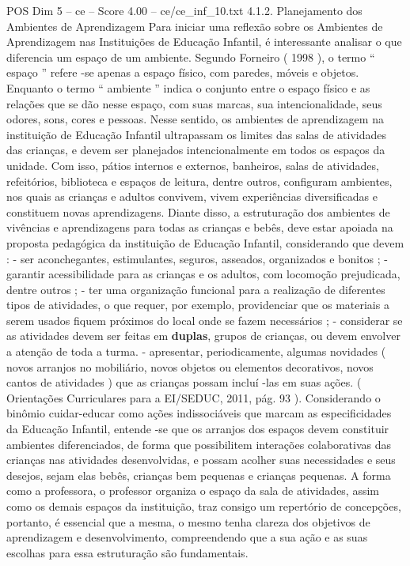 \begin{textsample}{POS Dim 5 – ce – Score 4.00 – ce/ce\_inf\_10.txt}  \label{ex:f5_pos_259}
4.1.2.
Planejamento dos Ambientes de Aprendizagem Para iniciar uma reflexão sobre os Ambientes de Aprendizagem nas Instituições de Educação Infantil, é interessante analisar o que diferencia um espaço de um ambiente.
Segundo Forneiro ( 1998 ), o termo “ espaço ” refere -se apenas a espaço físico, com paredes, móveis e objetos.
Enquanto o termo “ ambiente ” indica o conjunto entre o espaço físico e as relações que se dão nesse espaço, com suas marcas, sua intencionalidade, seus odores, sons, cores e pessoas.
Nesse sentido, os ambientes de aprendizagem na instituição de Educação Infantil ultrapassam os limites das salas de atividades das crianças, e devem ser planejados intencionalmente em todos os espaços da unidade.
Com isso, pátios internos e externos, banheiros, salas de atividades, refeitórios, biblioteca e espaços de leitura, dentre outros, configuram ambientes, nos quais as crianças e adultos convivem, vivem experiências diversificadas e constituem novas aprendizagens.
Diante disso, a estruturação dos ambientes de vivências e aprendizagens para todas as crianças e bebês, deve estar apoiada na proposta pedagógica da instituição de Educação Infantil, considerando que devem : - ser aconchegantes, estimulantes, seguros, asseados, organizados e bonitos ; - garantir acessibilidade para as crianças e os adultos, com locomoção prejudicada, dentre outros ; - ter uma organização funcional para a realização de diferentes tipos de atividades, o que requer, por exemplo, providenciar que os materiais a serem usados fiquem próximos do local onde se fazem necessários ; - considerar se as atividades devem ser feitas em \textbf{duplas}, grupos de crianças, ou devem envolver a atenção de toda a turma. - apresentar, periodicamente, algumas novidades ( novos arranjos no mobiliário, novos objetos ou elementos decorativos, novos cantos de atividades ) que as crianças possam incluí -las em suas ações. ( Orientações Curriculares para a EI/SEDUC, 2011, pág. 93 ).
Considerando o binômio cuidar-educar como ações indissociáveis que marcam as especificidades da Educação Infantil, entende -se que os arranjos dos espaços devem constituir ambientes diferenciados, de forma que possibilitem interações colaborativas das crianças nas atividades desenvolvidas, e possam acolher suas necessidades e seus desejos, sejam elas bebês, crianças bem pequenas e crianças pequenas.
A forma como a professora, o professor organiza o espaço da sala de atividades, assim como os demais espaços da instituição, traz consigo um repertório de concepções, portanto, é essencial que a mesma, o mesmo tenha clareza dos objetivos de aprendizagem e desenvolvimento, compreendendo que a sua ação e as suas escolhas para essa estruturação são fundamentais.

\end{textsample}
